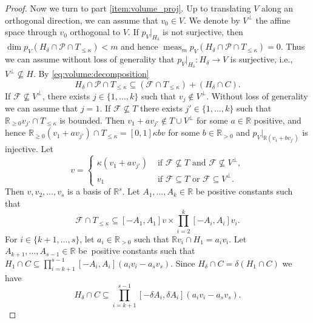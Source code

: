 \documentclass[11pt]{article}
\newcommand{\ie}{i.e.,\xspace}
\numberwithin{equation}{section}
\newcommand\RR{\mathbb{R}}
\DeclareMathOperator{\meas}{meas}
\theoremstyle{definition}
\numberwithin{theorem}{section}
\begin{document}
\begin{proof}
Now we turn to part \eqref{item:volume_proj}. Up to translating $V$ along an orthogonal direction, we can assume that $v_0\in V$. We denote by $V^{\perp}$ the affine space through $v_0$ orthogonal to $V$.
If $p_V|_{H_\delta}$ is not surjective, then $\dim p_V(H_\delta\cap\mathcal P\cap T_{\leq\kappa})<m$ and hence \hbox{$\meas_mp_V(H_\delta\cap\mathcal P\cap T_{\leq \kappa})=0$}. Thus we can assume without loss of generality that $p_V|_{H_\delta}: H_\delta\to V$ is surjective, \ie $V^{\perp}\nsubseteq H$.
By \eqref{eq:volume:decomposition}
\[
H_\delta\cap\mathcal P\cap T_{\leq \kappa}\subseteq (\mathcal F\cap T_{\leq\kappa})+(H_\delta\cap C).
\]
If $\mathcal F\nsubseteq V^{\perp}$, there exists $j\in\{1,\dots,k\}$ such that $v_{j}\notin V^{\perp}$. Without loss of generality we can assume that $j=1$.
If $\mathcal F\nsubseteq T$ there exists $j'\in\{1,\dots,k\}$ such that \hbox{$\RR_{\geq 0}v_{j'}\cap T_{\leq \kappa}$} is bounded. Then $v_1+a v_{j'}\notin T\cup V^{\perp}$ for some $a\in\RR$ positive, and hence \hbox{$\RR_{\geq 0}(v_1+av_{j'})\cap T_{\leq \kappa}=[0,1]\kappa b v$} for some $b\in\RR_{> 0}$ and $p_V|_{\RR (v_1+bv_{j'})}$ is injective.
Let \[
v=\begin{cases}
\kappa(v_1+av_{j'}) & \text{ if } \mathcal F\nsubseteq T \text{ and } \mathcal F\nsubseteq V^{\perp}, \\
v_1 & \text{ if }\mathcal F\subseteq T \text{ or } \mathcal F\subseteq V^{\perp}.
\end{cases}
\]
Then $v, v_2,\dots,v_s$ is a basis of $\RR^s$. Let $A_1,\dots,A_k\in\RR$ be positive constants such that
\begin{equation*}\label{eq:volume:projF}
\mathcal F\cap T_{\leq\kappa}\subseteq [- A_1, A_1] v\times \prod_{i=2}^k[-A_i, A_i]v_i.
\end{equation*}
For $i\!\in\!\{k+1,\dots,s\}$, let $a_i\!\in\!\RR_{>0}$ such that $\RR v_i\cap H_1=a_iv_i$. Let $A_{k+1},\dots,A_{s-1}\!\in\!\RR$ be~positive constants such that $H_1\cap C\subseteq \prod_{i=k+1}^{s-1}[-A_i, A_i](a_iv_i-a_sv_s)$.
Since $H_{\delta}\cap C=\delta(H_1\cap C)$ we have
\[
H_{\delta}\cap C\subseteq \prod_{i=k+1}^{s-1}[-\delta A_i, \delta A_i](a_iv_i-a_sv_s).
\]


\end{proof}
\end{document}
